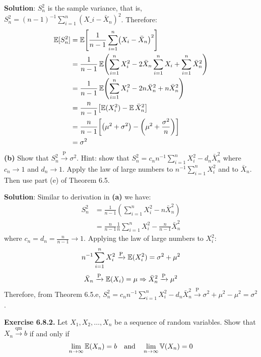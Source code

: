 \textbf{Solution}:
\(S_{n}^{2}\) is the sample variance, that is, $ S_{n}^{2} =
(n-1)^{-1} \sum_{i=1}^{n} ( X\_{i} - \bar{X}_{n})^{2} $.
Therefore:
\begin{align*}
\EXP[S_{n}^{2}] & = \EXP\left[ \frac {1}{n-1} \sum_{i=1}^{n} \left(X_{i} - \bar{X}_{n} \right)^{2} \right] \\
& = \frac {1}{n-1} \EXP \left( \sum_{i=1}^{n} X_{i}^{2} - 2 \bar{X}_{n} \sum_{i=1}^{n} X_{i} + \sum_{i=1}^{n} \bar{X}_{n}^{2} \right) \\
& = \frac {1}{n-1} \EXP \left( \sum_{i=1}^{n} X_{i}^{2} - 2 n \bar{X}_{n}^{2} + n \bar{X}_{n}^{2} \right) \\
& = \frac {n}{n-1} \left[ \EXP (X_{i}^{2}) - \EXP \bar{X}_{n}^{2} \right] \\
& = \frac {n}{n-1} \left[ \left( \mu^{2}+\sigma^{2} \right) - \left( \mu^{2} + \frac {\sigma^{2}}{n} \right) \right] \\
& = \sigma^{2}
\end{align*}
\textbf{(b)} Show that \(S_{n}^{2} \xrightarrow{\textrm{P}} \sigma^{2}\).
Hint: show that
\(S_{n}^{2} = c_{n} n^{-1} \sum_{i=1}^{n} X_{i}^{2} - d_{n} \bar{X}_{n}^{2}\) where
\(c_{n} \rightarrow 1\) and \(d_{n} \rightarrow 1\). Apply the law of large
numbers to \(n^{-1}\sum_{i=1}^{n} X_{i}^{2}\) and to \(\bar{X}_{n}\). Then
use part (e) of Theorem 6.5.

\textbf{Solution}:
Similar to derivation in \textbf{(a)} we have:
\begin{align*}
S_{n}^{2} & = \frac {1}{n-1} \left( \sum_{i=1}^{n} X_{i}^{2} - n \bar{X}_{n}^{2} \right) \\
& = \frac{n}{n-1} \frac{1}{n} \sum_{i=1}^{n} X_{i}^{2} - \frac{n}{n-1} \bar{X}_{n}^{2} 
\end{align*}
where \(c_{n} = d_{n} = \frac{n}{n-1} \rightarrow 1\).
Applying the law of large numbers to \(X_{i}^{2}\):
\[
n^{-1} \sum_{i=1}^{n} X_{i}^{2} \xrightarrow{\textrm{P}} \operatorname{\mathbb{E}}(X_{i}^{2}) = \sigma^{2} + \mu^{2}
\]
\[
\bar{X}_{n} \xrightarrow{\textrm{P}} \operatorname{\mathbb{E}}(X_{i}) = \mu \Rightarrow \bar{X}_{n}^{2} \xrightarrow{\textrm{P}} \mu^{2}
\]
Therefore, from Theorem 6.5.e, $ S_{n}^{2} = c_{n} n^{-1}
\sum_{i=1}^{n} X_{i}^{2} - d_{n} \bar{X}_{n}^{2}
\xrightarrow{\textrm{P}} \sigma^{2} + \mu^{2} - \mu^{2} =
\sigma^{2}$.

\textbf{Exercise 6.8.2.} Let \(X_{1}, X_{2}, \dots, X_{n}\) be a sequence of
random variables. Show that \(X_{n} \xrightarrow{\text{qm}} b\) if and
only if
\begin{align*}\lim_{n \rightarrow \infty} \operatorname{\mathbb{E}}(X_{n}) = b
\quad\mathrm{and}\quad 
\lim_{n \rightarrow \infty} \operatorname{\mathbb{V}}(X_{n}) = 0
\end{align*}

